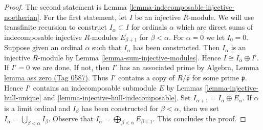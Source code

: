 \documentclass{amsart}
\theoremstyle{plain}
\theoremstyle{definition}
\theoremstyle{remark}
\numberwithin{equation}{subsection}
\begin{document}
\begin{proof}
The second statement is Lemma \ref{lemma-indecomposable-injective-noetherian}.
For the first statement, let $I$ be an injective $R$-module.
We will use transfinite recursion to construct $I_\alpha \subset I$
for ordinals $\alpha$ which are direct sums of indecomposable injective
$R$-modules $E_{\beta + 1}$ for $\beta < \alpha$.
For $\alpha = 0$ we let $I_0 = 0$. Suppose given an ordinal $\alpha$
such that $I_\alpha$ has been constructed. Then $I_\alpha$ is an
injective $R$-module by Lemma \ref{lemma-sum-injective-modules}.
Hence $I \cong I_\alpha \oplus I'$. If $I' = 0$ we are done.
If not, then $I'$ has an associated prime by
Algebra, Lemma \href{https://stacks.math.columbia.edu/tag/0587}{lemma ass zero (Tag 0587)}.
Thus $I'$ contains a copy of $R/\mathfrak p$ for some prime $\mathfrak p$.
Hence $I'$ contains an indecomposable submodule $E$ by
Lemmas \ref{lemma-injective-hull-unique} and
\ref{lemma-injective-hull-indecomposable}. Set
$I_{\alpha + 1} = I_\alpha \oplus E_\alpha$.
If $\alpha$ is a limit ordinal and $I_\beta$ has been constructed
for $\beta < \alpha$, then we set
$I_\alpha = \bigcup_{\beta < \alpha} I_\beta$.
Observe that $I_\alpha = \bigoplus_{\beta < \alpha} E_{\beta + 1}$.
This concludes the proof.
\end{proof}
\end{document}
